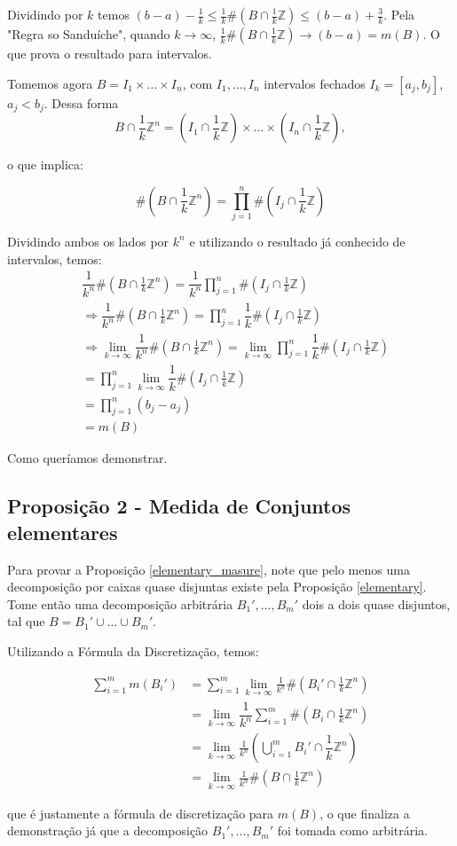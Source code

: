 \documentclass[12pt,letterpaper]{article}
\begin{document}
\begin{appendices}
		Dividindo por $k$ temos $(b-a)-\frac1k\leq\frac1k\#(B\cap\frac1k\mathbb{Z})\leq (b-a)+\frac3k$. Pela "Regra so Sanduíche", quando $k\to \infty$, $\frac1k\#(B\cap\frac1k\mathbb{Z})\to(b-a)=m(B)$. O que prova o resultado para intervalos.
		
		Tomemos agora $B=I_1\times\ldots\times I_n$, com $I_1,\ldots,I_n$ intervalos fechados $I_k=[a_j,b_j]$, $a_j<b_j$. Dessa forma
			$$B\cap\frac1k\mathbb{Z}^n=\left(I_1\cap\frac1k\mathbb{Z}\right)\times\ldots\times\left(I_n\cap\frac1k\mathbb{Z}\right),$$
			
			o que implica:
			
			$$\displaystyle\#\left(B\cap\frac1k\mathbb{Z}^n\right)=\prod_{j=1}^n\#\left(I_j\cap\frac1k\mathbb{Z}\right)$$
			\end{appendices}
	
	Dividindo ambos os lados por $k^n$ e utilizando o resultado já conhecido de intervalos, temos:
	\begin{align*}
		&\dfrac{1}{k^n}\#\left(B\cap\frac1k\mathbb{Z}^n\right)=\dfrac{1}{k^n}\prod_{j=1}^n\#\left(I_j\cap\frac1k\mathbb{Z}\right)\\
		&\Rightarrow \dfrac{1}{k^n}\#\left(B\cap\frac1k\mathbb{Z}^n\right)=\prod_{j=1}^n\dfrac1k\#\left(I_j\cap\frac1k\mathbb{Z}\right)\\
		&\Rightarrow\lim_{k\to\infty}\dfrac{1}{k^n}\#\left(B\cap\frac1k\mathbb{Z}^n\right)=\lim_{k\to\infty}\prod_{j=1}^n\dfrac1k\#\left(I_j\cap\frac1k\mathbb{Z}\right)\\
		&=\prod_{j=1}^n\lim_{k\to\infty}\dfrac1k\#\left(I_j\cap\frac1k\mathbb{Z}\right)\\
		&=\prod_{j=1}^n(b_j-a_j)\\
		&=m(B)
	\end{align*}

	Como queríamos demonstrar.
	
	\subsection{Proposição 2 - Medida de Conjuntos elementares}
	
	Para provar a Proposição \ref{elementary_masure}, note que pelo menos uma decomposição por caixas quase disjuntas existe pela Proposição \ref{elementary}. Tome então uma decomposição arbitrária $B_1',\ldots,B_m'$ dois a dois quase disjuntos, tal que $B=B_1'\cup\ldots\cup B_m'$. 
	
	Utilizando a Fórmula da Discretização, temos:
	
	\begin{align*}
		\displaystyle\sum_{i=1}^{m}m(B_i')&=\sum_{i=1}^m\lim_{k\to\infty}\frac1{k^n}\#\left(B_i'\cap\frac1k\mathbb{Z}^n\right)\\
		&=\lim_{k\to\infty}\dfrac{1}{k^n}\sum_{i=1}^{m}\#\left(B_i\cap\frac1k\mathbb{Z}^n\right)\\
		&=\lim_{k\to\infty}\frac{1}{k^n}\left(\bigcup_{i=1}^m B_i'\cap\dfrac1k\mathbb{Z}^n\right)\\
		&=\lim_{k\to\infty}\frac{1}{k^n}\#\left(B\cap\frac1k\mathbb{Z}^n\right)
	\end{align*}

	que é justamente a fórmula de discretização para $m(B)$, o que finaliza a demonstração já que a decomposição $B_1',\ldots,B_m'$ foi tomada como arbitrária.
	
	\newpage
	\printbibliography
\end{document}
